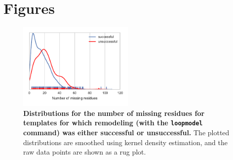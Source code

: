 \documentclass[aps,pre,twocolumn,nofootinbib,superscriptaddress,linenumbers]{revtex4-1}
\begin{document}
\section{Figures}

\begin{figure}[h]
    \includegraphics[width=0.5\textwidth]{loopmodel_analysis/nmissing_resis_distributions.pdf}
    \caption{{\bf Distributions for the number of missing residues for templates for which remodeling (with the {\tt loopmodel} command) was either successful or unsuccessful.}
    The plotted distributions are smoothed using kernel density estimation, and the raw data points are shown as a rug plot.
    }
    \label{si:loopmodel-nmissing-residues}
\end{figure}
\end{document}
